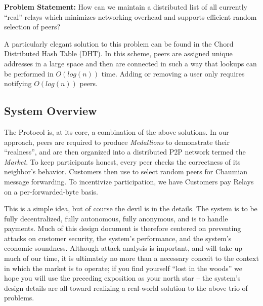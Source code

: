 \textbf{Problem Statement:} How can we maintain a distributed list of
all currently ``real'' relays which minimizes networking overhead and
supports efficient random selection of peers?

A particularly elegant solution to this problem can be found in the
Chord\cite{CHORD} Distributed Hash Table (DHT). In this scheme, peers
are assigned unique addresses in a large space and then are connected
in such a way that lookups can be performed in $O(log(n))$ time. Adding
or removing a user only requires notifying $O(log(n))$ peers.

\subsection{System Overview}

The \Orchid{} Protocol is, at its core, a combination of the above
solutions. In our approach, peers are required to
produce \emph{Medallions} to demonstrate their ``realness'', and are
then organized into a distributed P2P network termed the \emph{\Orchid{} Market}. To
keep \tOM{} participants honest, every peer checks the correctness of
its neighbor's behavior. Customers then use \tOM{} to select random
peers for Chaumian message forwarding. To incentivize participation,
we have Customers pay Relays on a per-forwarded-byte basis.

This is a simple idea, but of course the devil is in the details. The
system is to be fully decentralized, fully autonomous, fully
anonymous, and is to handle payments. Much of this design document is
therefore centered on preventing attacks on customer security, the system's performance, and the system's economic soundness. Although attack analysis is important, and will take up
much of our time, it is ultimately no more than a necessary conceit to
the context in which the market is to operate; if you find yourself
``lost in the woods'' we hope you will use the preceding exposition as
your north star -- the system's design details are all toward
realizing a real-world solution to the above trio of problems.
